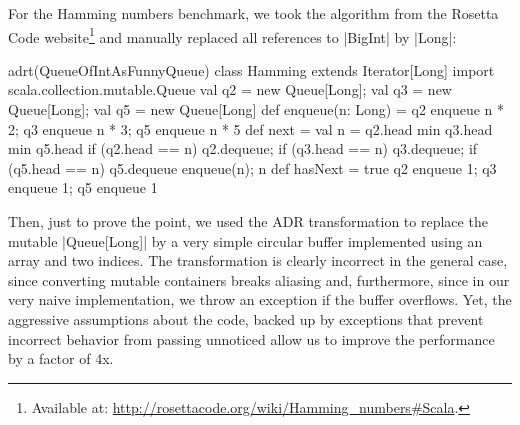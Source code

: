 For the Hamming numbers benchmark, we took the algorithm from the Rosetta Code website\footnote{Available at: \url{http://rosettacode.org/wiki/Hamming_numbers#Scala}.} and manually replaced all references to |BigInt| by |Long|:

\begin{lstlisting-nobreak}
adrt(QueueOfIntAsFunnyQueue) {
  class Hamming extends Iterator[Long] {
    import scala.collection.mutable.Queue
    val q2 = new Queue[Long]; val q3 = new Queue[Long]; val q5 = new Queue[Long]
    def enqueue(n: Long) = {
      q2 enqueue n * 2; q3 enqueue n * 3; q5 enqueue n * 5
    }
    def next = {
      val n = q2.head min q3.head min q5.head
      if (q2.head == n) q2.dequeue; if (q3.head == n) q3.dequeue; if (q5.head == n) q5.dequeue
      enqueue(n); n
    }
    def hasNext = true
    q2 enqueue 1; q3 enqueue 1; q5 enqueue 1
  }
}
\end{lstlisting-nobreak}

Then, just to prove the point, we used the ADR transformation to replace the mutable |Queue[Long]| by a very simple circular buffer implemented using an array and two indices. The transformation is clearly incorrect in the general case, since converting mutable containers breaks aliasing and, furthermore, since in our very naive implementation, we throw an exception if the buffer overflows. Yet, the aggressive assumptions about the code, backed up by exceptions that prevent incorrect behavior from passing unnoticed allow us to improve the performance by a factor of 4x.


